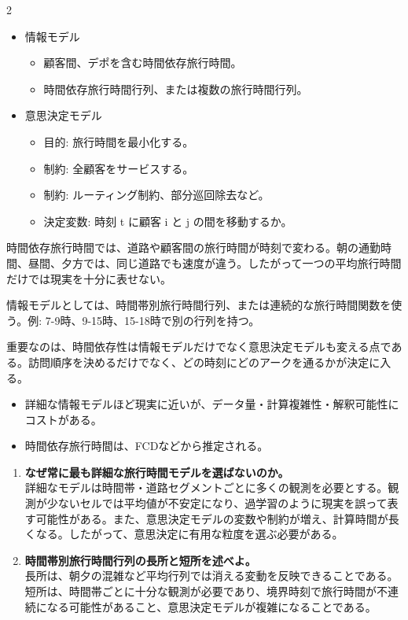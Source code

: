 \clearpage
{}
\begin{multicols}{2}\footnotesize\raggedcolumns
{}
\begin{itemize}
\item 情報モデル
\begin{itemize}
\item 顧客間、デポを含む時間依存旅行時間。
\item 時間依存旅行時間行列、または複数の旅行時間行列。
\end{itemize}
\item 意思決定モデル
\begin{itemize}
\item 目的: 旅行時間を最小化する。
\item 制約: 全顧客をサービスする。
\item 制約: ルーティング制約、部分巡回除去など。
\item 決定変数: 時刻 t に顧客 i と j の間を移動するか。
\end{itemize}
\end{itemize}
時間依存旅行時間では、道路や顧客間の旅行時間が時刻で変わる。朝の通勤時間、昼間、夕方では、同じ道路でも速度が違う。したがって一つの平均旅行時間だけでは現実を十分に表せない。\par

情報モデルとしては、時間帯別旅行時間行列、または連続的な旅行時間関数を使う。例: 7-9時、9-15時、15-18時で別の行列を持つ。\par

重要なのは、時間依存性は情報モデルだけでなく意思決定モデルも変える点である。訪問順序を決めるだけでなく、どの時刻にどのアークを通るかが決定に入る。\par
{}
\begin{itemize}
\item 詳細な情報モデルほど現実に近いが、データ量・計算複雑性・解釈可能性にコストがある。
\item 時間依存旅行時間は、FCDなどから推定される。
\end{itemize}
\begin{enumerate}
\item \textbf{なぜ常に最も詳細な旅行時間モデルを選ばないのか。}\\詳細なモデルは時間帯・道路セグメントごとに多くの観測を必要とする。観測が少ないセルでは平均値が不安定になり、過学習のように現実を誤って表す可能性がある。また、意思決定モデルの変数や制約が増え、計算時間が長くなる。したがって、意思決定に有用な粒度を選ぶ必要がある。
\item \textbf{時間帯別旅行時間行列の長所と短所を述べよ。}\\長所は、朝夕の混雑など平均行列では消える変動を反映できることである。短所は、時間帯ごとに十分な観測が必要であり、境界時刻で旅行時間が不連続になる可能性があること、意思決定モデルが複雑になることである。
\end{enumerate}
\end{multicols}


